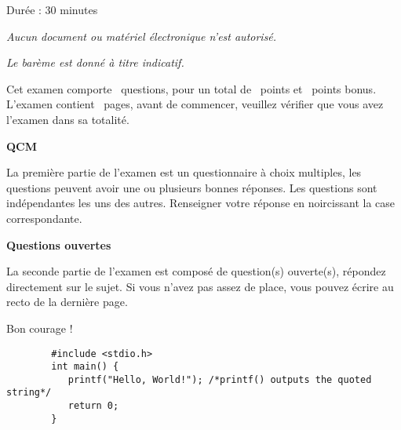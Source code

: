 \documentclass[12pt,a4paper,addpoints,answers]{exam}
\begin{document}
	
	\vspace*{2cm}
	
	\begin{center}
		
		Durée : 30 minutes
		
		\textit{Aucun document ou matériel électronique n’est autorisé.}
		
		\textit{Le barème est donné à titre indicatif.}
	\end{center}
	
	\vspace{1.5cm}
	\vspace{1.5cm}
	
	
	\begin{center}
		Cet examen comporte \numquestions\ questions, pour un total de \numpoints\ points et \numbonuspoints\ points bonus. L'examen contient \numpages\ pages, avant de commencer, veuillez vérifier que vous avez l'examen dans sa totalité.
	\end{center}
	
	\vspace{1.5cm}
	
	\textbf{QCM}
	
	La première partie de l'examen est un questionnaire à choix multiples, les questions peuvent avoir une ou plusieurs bonnes réponses. Les questions sont indépendantes les uns des autres. Renseigner votre réponse en noircissant la case correspondante.
	
	\vspace{1.5cm}
	
	\textbf{Questions ouvertes}
	
	La seconde partie de l'examen est composé de question(s) ouverte(s), répondez directement sur le sujet. Si vous n'avez pas assez de place, vous pouvez écrire au recto de la dernière page.
	
	\vspace{1.5cm}
	
	\begin{center}
		Bon courage ! \blacksmiley{}
	\end{center}
	
	\newpage
	
	\begin{center}
	\end{center}

	\newpage

	\begin{verbatim}
		#include <stdio.h>
		int main() {
		   printf("Hello, World!"); /*printf() outputs the quoted string*/
		   return 0;
		}
		\end{verbatim}
	
\end{document}
